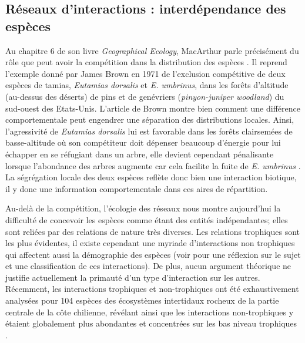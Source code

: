 \subsection*{Réseaux d'interactions : interdépendance des
espèces}\label{ruxe9seaux-dinteractions-interduxe9pendance-des-espuxe8ces}

Au chapitre 6 de son livre \emph{Geographical Ecology}, MacArthur parle
précisément du rôle que peut avoir la compétition dans la distribution
des espèces \citep{macarthur1972geographical}. Il reprend l'exemple
donné par James Brown en 1971 de l'exclusion compétitive de deux espèces
de tamias, \emph{Eutamias dorsalis} et \emph{E. umbrinus}, dans les
forêts d'altitude (au-dessus des déserts) de pins et de genévriers
(\emph{pinyon-juniper woodland}) du sud-ouest des Etats-Unis. L'article
de Brown montre bien comment une différence comportementale peut
engendrer une séparation des distributions locales. Ainsi, l'agressivité
de \emph{Eutamias dorsalis} lui est favorable dans les forêts
clairsemées de basse-altitude où son compétiteur doit dépenser beaucoup
d'énergie pour lui échapper en se réfugiant dans un arbre, elle devient
cependant pénalisante lorsque l'abondance des arbres augmente car cela
facilite la fuite de \emph{E. umbrinus} \citep{Brown1971}. La
ségrégation locale des deux espèces reflète donc bien une interaction
biotique, il y donc une information comportementale dans ces aires de
répartition.

Au-delà de la compétition, l'écologie des réseaux nous montre
aujourd'hui la difficulté de concevoir les espèces comme étant des
entités indépendantes; elles sont reliées par des relations de nature
très diverses. Les relations trophiques sont les plus évidentes, il
existe cependant une myriade d'interactions non trophiques qui affectent
aussi la démographie des espèces (voir \citet{Kefi2012} pour une
réflexion sur le sujet et une classification de ces interactions). De
plus, aucun argument théorique ne justifie actuellement la primauté d'un
type d'interaction sur les autres. Récemment, les interactions
trophiques et non-trophiques ont été exhaustivement analysées pour 104
espèces des écosystèmes intertidaux rocheux de la partie centrale de la
côte chilienne, révélant ainsi que les interactions non-trophiques y
étaient globalement plus abondantes et concentrées sur les bas niveau
trophiques \citep{Kefi2015}.

